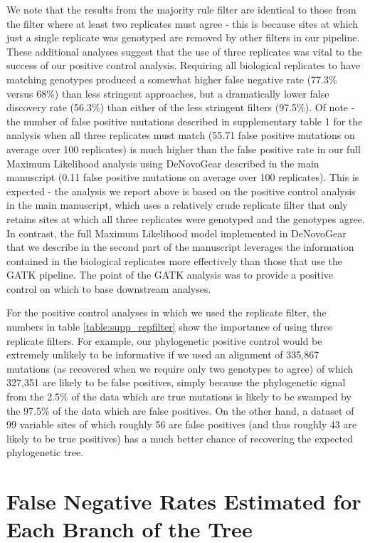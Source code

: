 We note that the results from the majority rule filter are identical to those from the filter where at least two replicates must agree - this is because sites at which just a single replicate was genotyped are removed by other filters in our pipeline.
These additional analyses suggest that the use of three replicates was vital to the success of our positive control analysis. Requiring all biological replicates to have matching genotypes produced a somewhat higher false negative rate (77.3\% versus 68\%) than less stringent approaches, but a dramatically lower false discovery rate (56.3\%) than either of the less stringent filters  (97.5\%). Of note - the number of false positive mutations described in supplementary table 1 for the analysis when all three replicates must match (55.71 false positive mutations on average over 100 replicates) is much higher than the false positive rate in our full Maximum Likelihood analysis using DeNovoGear described in the main manuscript (0.11 false positive mutations on average over 100 replicates). This is expected - the analysis we report above is based on the positive control analysis in the main manuscript, which uses a relatively crude replicate filter that only retains sites at which all three replicates were genotyped and the genotypes agree. In contrast, the full Maximum Likelihood model implemented in DeNovoGear that we describe in the second part of the manuscript leverages the information contained in the biological replicates more effectively than those that use the GATK pipeline. The point of the GATK analysis was to provide a positive control on which to base downstream analyses. 

For the positive control analyses in which we used the replicate filter, the numbers in table \ref{table:supp_repfilter} show the importance of using three replicate filters. For example, our phylogenetic positive control would be extremely unlikely to be informative if we used an alignment of 335,867 mutations (as recovered when we require only two genotypes to agree) of which 327,351 are likely to be false positives, simply because the phylogenetic signal from the 2.5\% of the data which are true mutations is likely to be swamped by the 97.5\% of the data which are false positives. On the other hand, a dataset of 99 variable sites of which roughly 56 are false positives (and thus roughly 43 are likely to be true positives) has a much better chance of recovering the expected phylogenetic tree.

\section{False Negative Rates Estimated for Each Branch of the Tree}

